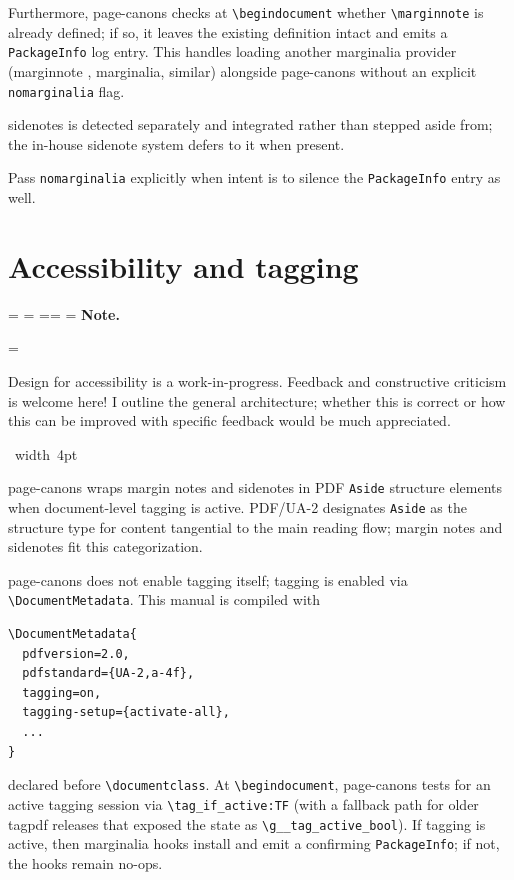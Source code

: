 \documentclass[11pt, twoside, openany]{book}
\makeatletter
\newcommand{\pkg}[1]{\textsf{#1}}
\newcommand{\cmd}[1]{\texttt{\textbackslash #1}}
\newcommand*{\cns@tag@artifact@begin}{}
\newcommand*{\cns@tag@artifact@end}{}
\newenvironment{TodoNote}[1][]{%
  \par\addvspace{0.5\baselineskip plus 2pt}%
  \setbox\cns@box=\vbox\bgroup
    \hsize=\linewidth
    \advance\hsize -10pt
    \linewidth=\hsize \columnwidth=\hsize
    \parindent=\z@
    \noindent\textbf{\sffamily Note\cns@ifnotempty{#1}{ \textmd{(#1)}}.}%
    \par\nobreak
    \@afterindentfalse\@afterheading
    \leftskip=\cns@indent\relax
    \ignorespaces
}{%
  \par
  \egroup
  \vbox{\hbox{%
    \cns@tag@artifact@begin\vrule width 4pt\cns@tag@artifact@end
    \hskip 6pt\relax
    \box\cns@box
  }}%
  \par\addvspace{0.5\baselineskip plus 2pt}%
}
\makeatother
\begin{document}
Furthermore, \pkg{page-canons} checks at \cmd{begin{document}} whether \cmd{marginnote} is already defined; if so, it leaves the existing definition intact and emits a \texttt{PackageInfo} log entry. This handles loading another marginalia provider (\pkg{marginnote} \cite{marginnote}, \pkg{marginalia}, similar) alongside \pkg{page-canons} without an explicit \texttt{nomarginalia} flag.

\pkg{sidenotes} \cite{sidenotes} is detected separately and integrated rather than stepped aside from; the in-house sidenote system defers to it when present.

Pass \texttt{nomarginalia} explicitly when intent is to silence the \texttt{PackageInfo} entry as well.

\section{Accessibility and tagging}\label{sec:tagging}

\begin{TodoNote}
    Design for accessibility is a work-in-progress. Feedback and constructive criticism is welcome here! I outline the general architecture; whether this is correct or how this can be improved with specific feedback would be much appreciated.
\end{TodoNote}

\pkg{page-canons} wraps margin notes and sidenotes in PDF \texttt{Aside} structure elements when document-level tagging is active. PDF/UA-2 designates \texttt{Aside} as the structure type for content tangential to the main reading flow; margin notes and sidenotes fit this categorization.

\pkg{page-canons} does not enable tagging itself; tagging is enabled via \cmd{DocumentMetadata}. This manual is compiled with

\begin{verbatim}
\DocumentMetadata{
  pdfversion=2.0,
  pdfstandard={UA-2,a-4f},
  tagging=on,
  tagging-setup={activate-all},
  ...
}
\end{verbatim}

declared before \cmd{documentclass}. At \cmd{begin{document}}, \pkg{page-canons} tests for an active tagging session via \cmd{tag\_if\_active:TF} (with a fallback path for older \pkg{tagpdf} releases that exposed the state as \cmd{g\_\_tag\_active\_bool}). If tagging is active, then marginalia hooks install and emit a confirming \texttt{PackageInfo}; if not, the hooks remain no-ops.
\end{document}
